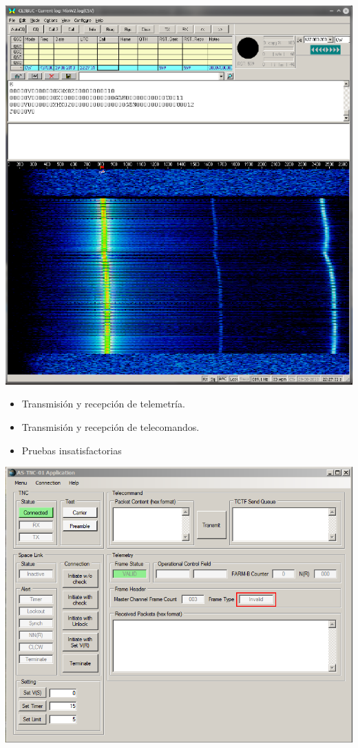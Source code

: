 \documentclass[xcolor=dvipsnames]{beamer}
\begin{document}
\begin{frame}[allowframebreaks]
        \begin{center}
            \includegraphics[height=0.65\textheight]{img/beacon2.png}
        \end{center}
        
        \newpage
        \begin{itemize}
            \item Transmisión y recepción de telemetría.
            \item Transmisión y recepción de telecomandos.
            \item  \alert{Pruebas insatisfactorias}
        \end{itemize}

        \begin{center}
            \includegraphics[height=0.65\textheight]{img/test_telemetria.png}
        \end{center}


\end{frame}
\end{document}
